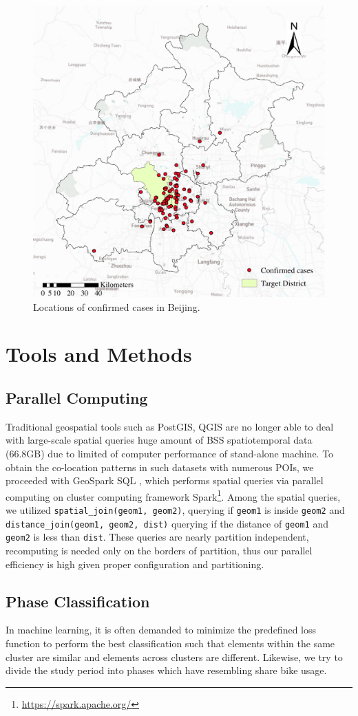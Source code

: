 \documentclass[ijgi,submit,moreauthors,pdftex]{Definitions/mdpi}
\begin{document}
\begin{figure}[ht]
    \centering
    \includegraphics[width=.5\textwidth]{Figures/Plot_location_confirmed_cases-eps-converted-to.pdf}
    \caption{Locations of confirmed cases in Beijing.}
    \label{fig:locations_of_confirmed_cases}
\end{figure}

\section{Tools and Methods}

\subsection{Parallel Computing}
Traditional geospatial tools such as PostGIS, QGIS are no longer able to deal with large-scale spatial queries huge amount of BSS spatiotemporal data (66.8GB) due to limited of computer performance of stand-alone machine.
To obtain the co-location patterns in such datasets with numerous POIs, we proceeded with GeoSpark SQL \cite{huang2017geospark}, which performs spatial queries via parallel computing on cluster computing framework Spark\footnote{\url{https://spark.apache.org/}}.
Among the spatial queries, we utilized \texttt{spatial\_join(geom1, geom2)}, querying if \texttt{geom1} is inside \texttt{geom2} and \texttt{distance\_join(geom1, geom2, dist)} querying if the distance of \texttt{geom1} and \texttt{geom2} is less than \texttt{dist}.
These queries are nearly partition independent, recomputing is needed only on the borders of partition, thus our parallel efficiency is high given proper configuration and partitioning.

\subsection{Phase Classification}\label{sec:phase_classification}
In machine learning, it is often demanded to minimize the predefined loss function to perform the best classification such that elements within the same cluster are similar and elements across clusters are different.
Likewise, we try to divide the study period into phases which have resembling share bike usage.
\end{document}
